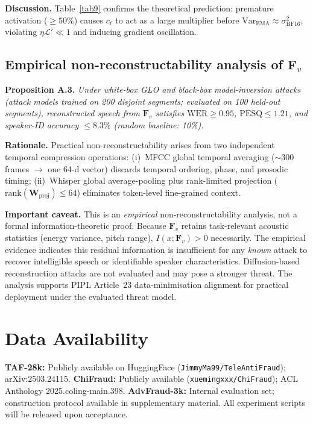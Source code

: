 \documentclass[lettersize,journal]{IEEEtran}
\begin{document}
\textbf{Discussion.}  Table~\ref{tab9} confirms the theoretical
prediction: premature activation ($\ge 50\%$) causes $c_\ell$ to act
as a large multiplier before $\mathrm{Var}_{\mathrm{EMA}}\approx
\sigma^2_{\mathrm{BF16}}$, violating $\eta\mathcal{L}'\ll 1$ and
inducing gradient oscillation.

\subsection{Empirical non-reconstructability analysis of $\bm{F}_v$}

\textbf{Proposition A.3.}  \emph{Under white-box GLO and black-box
model-inversion attacks (attack models trained on 200 disjoint
segments; evaluated on 100 held-out segments), reconstructed speech
from $\bm{F}_v$ satisfies $\mathrm{WER}\ge 0.95$, $\mathrm{PESQ}
\le 1.21$, and speaker-ID accuracy $\le 8.3\%$ (random baseline:
10\%).}

\textbf{Rationale.}  Practical non-reconstructability arises from two
independent temporal compression operations: (i)~MFCC global temporal
averaging ($\sim$300 frames $\rightarrow$ one 64-d vector) discards
temporal ordering, phase, and prosodic timing; (ii)~Whisper global
average-pooling plus rank-limited projection
($\mathrm{rank}(\bm{W}_{\mathrm{proj}})\le 64$) eliminates
token-level fine-grained context.

\textbf{Important caveat.}  This is an \emph{empirical}
non-reconstructability analysis, not a formal information-theoretic
proof.  Because $\bm{F}_v$ retains task-relevant acoustic statistics
(energy variance, pitch range), $I(x;\bm{F}_v)>0$ necessarily.  The
empirical evidence indicates this residual information is insufficient
for any \emph{known} attack to recover intelligible speech or
identifiable speaker characteristics.  Diffusion-based reconstruction
attacks are not evaluated and may pose a stronger threat.  The
analysis supports PIPL Article~23 data-minimisation alignment for
practical deployment under the evaluated threat model.

\section*{Data Availability}

\textbf{TAF-28k:} Publicly available on HuggingFace
(\texttt{JimmyMa99/TeleAntiFraud}); arXiv:2503.24115.
\textbf{ChiFraud:} Publicly available (\texttt{xuemingxxx/ChiFraud});
ACL Anthology 2025.coling-main.398.
\textbf{AdvFraud-3k:} Internal evaluation set; construction protocol
available in supplementary material.  All experiment scripts will be
released upon acceptance.
\end{document}
